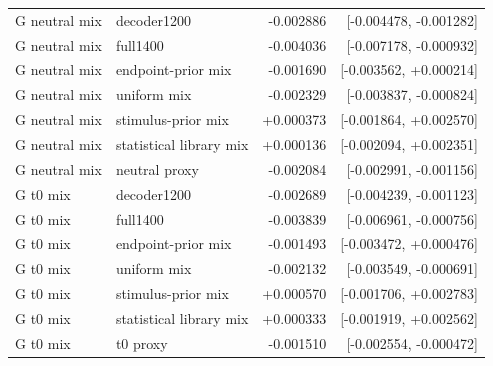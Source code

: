 \documentclass[10pt]{article}
\begin{document}
\begin{longtable}{llrr}
G neutral mix & decoder1200 & -0.002886 & [-0.004478, -0.001282]\\
G neutral mix & full1400 & -0.004036 & [-0.007178, -0.000932]\\
G neutral mix & endpoint-prior mix & -0.001690 & [-0.003562, +0.000214]\\
G neutral mix & uniform mix & -0.002329 & [-0.003837, -0.000824]\\
G neutral mix & stimulus-prior mix & +0.000373 & [-0.001864, +0.002570]\\
G neutral mix & statistical library mix & +0.000136 & [-0.002094, +0.002351]\\
G neutral mix & neutral proxy & -0.002084 & [-0.002991, -0.001156]\\
G t0 mix & decoder1200 & -0.002689 & [-0.004239, -0.001123]\\
G t0 mix & full1400 & -0.003839 & [-0.006961, -0.000756]\\
G t0 mix & endpoint-prior mix & -0.001493 & [-0.003472, +0.000476]\\
G t0 mix & uniform mix & -0.002132 & [-0.003549, -0.000691]\\
G t0 mix & stimulus-prior mix & +0.000570 & [-0.001706, +0.002783]\\
G t0 mix & statistical library mix & +0.000333 & [-0.001919, +0.002562]\\
G t0 mix & t0 proxy & -0.001510 & [-0.002554, -0.000472]\\
\bottomrule\end{longtable}
\end{document}

